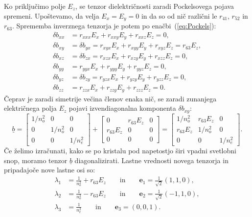 Ko priključimo 
polje $E_z$, se tenzor dielektričnosti zaradi Pockelsovega pojava spremeni. Upoštevamo,
da velja $E_x=E_y=0$ in da so od nič različni le $r_{41}$, $r_{52}$ in $r_{63}$. 
Sprememba inverznega tenzorja je potem po enačbi~(\ref{eq:Pockels}):
\begin{align}
\delta b_{xx} & =r_{xxx}E_x + r_{xxy}E_y + r_{xxz}E_z = 0,\nonumber \\
\delta b_{xy} & = \delta b_{yx} = r_{xyx}E_x + r_{xyy}E_y + r_{xyz}E_z = r_{63}E_z,\nonumber\\
\delta b_{xz} & = \delta b_{zx} = r_{xzx}E_x + r_{xzy}E_y + r_{xzz}E_z = 0,\nonumber\\
\delta b_{yy} & = r_{yyx}E_x + r_{yyy}E_y + r_{yyz}E_z= 0,\nonumber\\
\delta b_{yz} & = \delta b_{zy} = r_{yzx}E_x + r_{yzy}E_y + r_{yzz}E_z= 0,\nonumber\\
\delta b_{zz} & = r_{zzx}E_x + r_{zzy}E_y + r_{zzz}E_z = 0.
\end{align}
Čeprav je zaradi simetrije večina členov enaka nič, se zaradi zunanjega električnega
polja $E_z$ pojavi izvendiagonalna komponenta $\delta b_{xy}$:
\begin{equation}
\underline{b} = 
\left[\begin{array}{ccc}
1/n_o^2 & 0& 0\\
0 & 1/n_o^2 & 0\\
0 & 0& 1/n_e^2
\end{array}\right] + \left[\begin{array}{ccc}
 0& r_{63}E_z& 0\\
r_{63}E_z & 0 & 0\\
0 & 0&  0
\end{array}\right] = \left[\begin{array}{ccc}
1/n_o^2 & r_{63}E_z& 0\\
r_{63}E_z& 1/n_o^2 & 0\\
0 & 0&  1/n_e^2
\end{array}\right]\!\!.
\label{7.8a}
\end{equation}
Če želimo izračunati, kako se po kristalu pod napetostjo širi vpadni svetlobni
snop, moramo tenzor $\underline{b}$ diagonalizirati. Lastne vrednosti novega tenzorja
in pripadajoče nove lastne osi so:
\begin{align}
\lambda_1 &= \frac{1}{n_o^2}+ r_{63}E_z \qquad \mathrm{in} \qquad \mathbf{e}_1 = \frac{1}{\sqrt{2}}(1,1,0),\\
\lambda_2 &= \frac{1}{n_o^2}- r_{63}E_z \qquad \mathrm{in} \qquad \mathbf{e}_2 = \frac{1}{\sqrt{2}}(-1,1,0),\\
\lambda_3 &= \frac{1}{n_e^2} \qquad \mathrm{in} \qquad \mathbf{e}_3 = (0,0,1).
\end{align}
